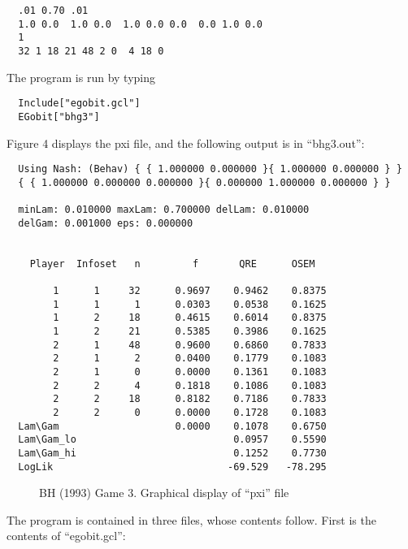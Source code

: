 \begin{verbatim}
  .01 0.70 .01
  1.0 0.0  1.0 0.0  1.0 0.0 0.0  0.0 1.0 0.0 
  1
  32 1 18 21 48 2 0  4 18 0
\end{verbatim}

\noindent
The program is run by typing 

\begin{verbatim}
  Include["egobit.gcl"]
  EGobit["bhg3"]
\end{verbatim}

\noindent
Figure 4 displays the pxi file, and the following output is in
``bhg3.out'':

\begin{verbatim}
  Using Nash: (Behav) { { 1.000000 0.000000 }{ 1.000000 0.000000 } }
  { { 1.000000 0.000000 0.000000 }{ 0.000000 1.000000 0.000000 } }

  minLam: 0.010000 maxLam: 0.700000 delLam: 0.010000
  delGam: 0.001000 eps: 0.000000


    Player  Infoset   n         f       QRE      OSEM

        1      1     32      0.9697    0.9462    0.8375
        1      1      1      0.0303    0.0538    0.1625
        1      2     18      0.4615    0.6014    0.8375
        1      2     21      0.5385    0.3986    0.1625
        2      1     48      0.9600    0.6860    0.7833
        2      1      2      0.0400    0.1779    0.1083
        2      1      0      0.0000    0.1361    0.1083
        2      2      4      0.1818    0.1086    0.1083
        2      2     18      0.8182    0.7186    0.7833
        2      2      0      0.0000    0.1728    0.1083
  Lam\Gam                    0.0000    0.1078    0.6750
  Lam\Gam_lo                           0.0957    0.5590
  Lam\Gam_hi                           0.1252    0.7730
  LogLik                              -69.529   -78.295
\end{verbatim}


\newpage
\begin{figure}[htp]
\centerline{}
\vspace{.5in}
\centerline{}
\caption{BH (1993) Game 3. Graphical display of ``pxi'' file }
\end{figure}

\noindent
The program is contained in three files, whose contents follow.  First
is the contents of ``egobit.gcl'':

